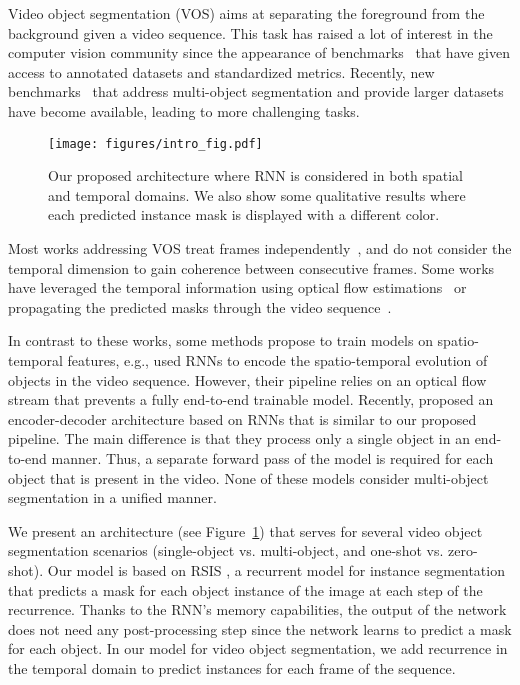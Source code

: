 \documentclass[10pt,twocolumn,letterpaper]{article}
\begin{document}
Video object segmentation (VOS) aims at separating the foreground from the background given a video sequence. This task has raised a lot of interest in the computer vision community since the appearance of benchmarks~\cite{Perazzi2016} that have given access to annotated datasets and standardized metrics. Recently, new benchmarks~\cite{Pont-Tuset_arXiv_2017, xu2018youtube-benchmark} that address multi-object segmentation and provide larger datasets have become available, leading to more challenging tasks.

\begin{figure}
  \centering
  \texttt{[image: figures/intro\_fig.pdf]}
  \caption{Our proposed architecture where RNN is considered in both spatial and temporal domains. We also show some qualitative results where each predicted instance mask is displayed with a different color.}
  \label{fig:spatiotemporal-RSIS}
\end{figure}

Most works addressing VOS treat frames independently~\cite{caelles2017one, voigtlaender2017online, maninis2018video, Cheng_favos_2018}, and do not consider the temporal dimension to gain coherence between consecutive frames. Some works have leveraged the temporal information using optical flow estimations~\cite{cheng2017segflow, jain2017fusionseg, tokmakov2017learning, bao2018cnn} or propagating the predicted masks through the video sequence~\cite{perazzi2017learning, yang2018efficient}.





In contrast to these works, some methods propose to train models on 
spatio-temporal features, e.g., \cite{tokmakov2017learning} used RNNs to encode the spatio-temporal evolution of objects in the video sequence. However, their pipeline relies on an optical flow stream that prevents a fully end-to-end trainable model. Recently, \cite{xu2018youtube} proposed an encoder-decoder architecture based on RNNs that is similar to our proposed pipeline. The main difference is that they process only a single object in an end-to-end manner. Thus, a separate forward pass of the model is required for each object that is present in the video. None of these models consider multi-object segmentation in a unified manner.  

We present an architecture (see Figure~\ref{fig:spatiotemporal-RSIS}) that serves for several video object segmentation scenarios (single-object vs. multi-object, and one-shot vs. zero-shot). Our model is based on RSIS \cite{Salvador17}, a recurrent model for instance segmentation that predicts a mask for each object instance of the image at each step of the recurrence. Thanks to the RNN's memory capabilities, the output of the network does not need any post-processing step since the network learns to predict a mask for each object. In our model for video object segmentation, we add recurrence in the temporal domain to predict instances for each frame of the sequence.
\end{document}
